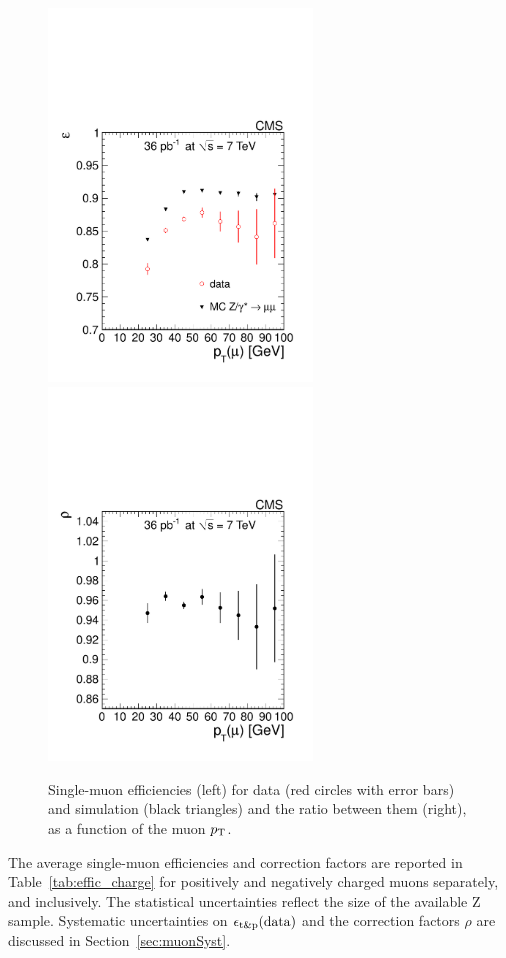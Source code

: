 \begin{figure}
  \begin{center}
  \includegraphics[width=7cm]{figs/efficiency_pt.pdf}%
  \includegraphics[width=7cm]{figs/correction_factor_pt.pdf}
  \end{center}
\caption{Single-muon efficiencies (left) for data (red circles with error bars) 
and simulation (black triangles) and the ratio between them (right), 
as a function of the muon $p_{\mathrm{T}}$.}
\label{rho_pt}
\end{figure}

The average single-muon efficiencies and correction factors are reported in Table~\ref{tab:effic_charge}
for positively and negatively charged muons separately, and inclusively.
The statistical uncertainties reflect the size of the available Z sample. Systematic uncertainties
on $\epsilon_{\mathrm{t\&p}}(\mathrm{data})$ and the correction factors $\rho$ are discussed in Section~\ref{sec:muonSyst}.

